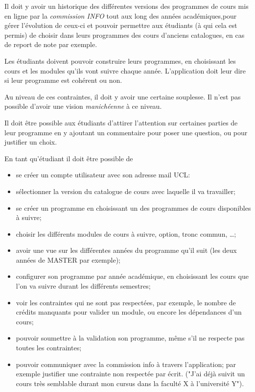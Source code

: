 Il doit y avoir un historique des différentes versions des programmes de cours mis en ligne par la \textit{commission INFO} tout aux long des années académiques,pour gérer l'évolution de ceux-ci et pouvoir permettre aux étudiants (à qui cela est permis) de choisir dans leurs programmes des cours d'anciens catalogues, en cas de report de note par exemple.
 
Les étudiants doivent pouvoir construire leurs programmes, en choisissant les cours et les modules qu'ils vont suivre chaque année. L'application doit leur dire si leur programme est cohérent ou non.

Au niveau de ces contraintes, il doit y avoir une certaine souplesse. Il n'est pas possible d'avoir une vision \textit{manichéenne} à ce niveau.

Il doit être possible aux étudiants d'attirer l'attention sur certaines parties de leur programme en y ajoutant un commentaire pour poser une question, ou pour justifier un choix.

En tant qu'étudiant il doit être possible de
\begin{itemize}
\item se créer un compte utilisateur avec son adresse mail UCL:
\item sélectionner la version du catalogue de cours avec laquelle il va travailler;
\item se créer un programme en choisissant un des programmes de cours disponibles à suivre;
\item choisir les différents modules de cours à suivre, option, tronc commun, \ldots ;
\item avoir une vue sur les différentes années du programme qu'il suit (les deux années de MASTER par exemple);
\item configurer son programme par année académique, en choisissant les cours que l'on va suivre durant les différents semestres;
\item voir les contraintes qui ne sont pas respectées, par exemple, le nombre de crédits manquants pour valider un module, ou encore les dépendances d'un cours;
\item pouvoir soumettre à la validation son programme, même s'il ne respecte pas toutes les contraintes;
\item pouvoir communiquer avec la commission info à travers l'application; par exemple justifier une contrainte non respectée par écrit. ("J'ai déjà suivit un cours très semblable durant mon cursus dans la faculté X à l'université Y").  
\end{itemize}

